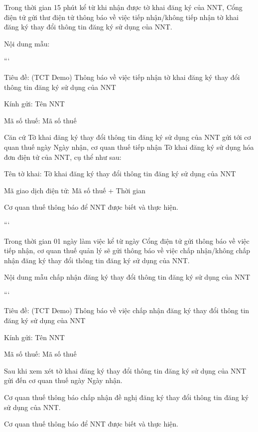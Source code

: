 

Trong thời gian 15 phút kể từ khi nhận được tờ khai đăng ký của NNT, Cổng điện tử gửi thư điện tử thông báo về việc tiếp nhận/không tiếp nhận tờ khai đăng ký thay đổi thông tin đăng ký sử dụng của NNT.

Nội dung mẫu:

```

Tiêu đề: (TCT Demo) Thông báo về việc tiếp nhận tờ khai đăng ký thay đổi thông tin đăng ký sử dụng của NNT

Kính gửi: {{Tên NNT}}

Mã số thuế: {{Mã số thuế}}

Căn cứ Tờ khai đăng ký thay đổi thông tin đăng ký sử dụng của NNT gửi tới cơ quan thuế ngày {{Ngày nhận}}, cơ quan thuế tiếp nhận Tờ khai đăng ký sử dụng hóa đơn điện tử của NNT, cụ thể như sau:

Tên tờ khai: Tờ khai đăng ký thay đổi thông tin đăng ký sử dụng của NNT

Mã giao dịch điện tử: {{Mã số thuế + Thời gian}}

Cơ quan thuế thông báo để NNT được biết và thực hiện.

```


Trong thời gian 01 ngày làm việc kể từ ngày Cổng điện tử gửi thông báo về việc tiếp nhận, cơ quan thuế quản lý sẽ gửi thông báo về việc chấp nhận/không chấp nhận đăng ký thay đổi thông tin đăng ký sử dụng của NNT.

Nội dung mẫu chấp nhận đăng ký thay đổi thông tin đăng ký sử dụng của NNT

```

Tiêu đề: (TCT Demo) Thông báo về việc chấp nhận đăng ký thay đổi thông tin đăng ký sử dụng của NNT

Kính gửi: {{Tên NNT}}

Mã số thuế: {{Mã số thuế}}

Sau khi xem xét tờ khai đăng ký thay đổi thông tin đăng ký sử dụng của NNT gửi đến cơ quan thuế ngày {{Ngày nhận}}.

Cơ quan thuế thông báo chấp nhận đề nghị đăng ký thay đổi thông tin đăng ký sử dụng của NNT.

Cơ quan thuế thông báo để NNT được biết và thực hiện.

